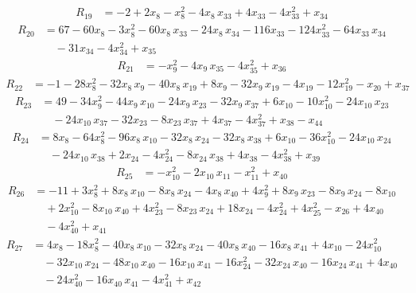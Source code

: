 \begin{align*}
R_{19} &= -2 +2x_{8} -x_{8}^{2} -4x_{8}\,x_{33} +4x_{33} -4x_{33}^{2} +x_{34}
\end{align*}
\begin{align*}
R_{20} &= 67 -60x_{8} -3x_{8}^{2} -60x_{8}\,x_{33} -24x_{8}\,x_{34} -116x_{33} -124x_{33}^{2} -64x_{33}\,x_{34} \\
&\quad {} -31x_{34} -4x_{34}^{2} +x_{35}
\end{align*}
\begin{align*}
R_{21} &= -x_{9}^{2} -4x_{9}\,x_{35} -4x_{35}^{2} +x_{36}
\end{align*}
\begin{align*}
R_{22} &= -1 -28x_{8}^{2} -32x_{8}\,x_{9} -40x_{8}\,x_{19} +8x_{9} -32x_{9}\,x_{19} -4x_{19} -12x_{19}^{2} -x_{20} +x_{37}
\end{align*}
\begin{align*}
R_{23} &= 49 -34x_{9}^{2} -44x_{9}\,x_{10} -24x_{9}\,x_{23} -32x_{9}\,x_{37} +6x_{10} -10x_{10}^{2} -24x_{10}\,x_{23} \\
&\quad {} -24x_{10}\,x_{37} -32x_{23} -8x_{23}\,x_{37} +4x_{37} -4x_{37}^{2} +x_{38} -x_{44}
\end{align*}
\begin{align*}
R_{24} &= 8x_{8} -64x_{8}^{2} -96x_{8}\,x_{10} -32x_{8}\,x_{24} -32x_{8}\,x_{38} +6x_{10} -36x_{10}^{2} -24x_{10}\,x_{24} \\
&\quad {} -24x_{10}\,x_{38} +2x_{24} -4x_{24}^{2} -8x_{24}\,x_{38} +4x_{38} -4x_{38}^{2} +x_{39}
\end{align*}
\begin{align*}
R_{25} &= -x_{10}^{2} -2x_{10}\,x_{11} -x_{11}^{2} +x_{40}
\end{align*}
\begin{align*}
R_{26} &= -11 +3x_{8}^{2} +8x_{8}\,x_{10} -8x_{8}\,x_{24} -4x_{8}\,x_{40} +4x_{9}^{2} +8x_{9}\,x_{23} -8x_{9}\,x_{24} -8x_{10} \\
&\quad {} +2x_{10}^{2} -8x_{10}\,x_{40} +4x_{23}^{2} -8x_{23}\,x_{24} +18x_{24} -4x_{24}^{2} +4x_{25}^{2} -x_{26} +4x_{40} \\
&\quad {} -4x_{40}^{2} +x_{41}
\end{align*}
\begin{align*}
R_{27} &= 4x_{8} -18x_{8}^{2} -40x_{8}\,x_{10} -32x_{8}\,x_{24} -40x_{8}\,x_{40} -16x_{8}\,x_{41} +4x_{10} -24x_{10}^{2} \\
&\quad {} -32x_{10}\,x_{24} -48x_{10}\,x_{40} -16x_{10}\,x_{41} -16x_{24}^{2} -32x_{24}\,x_{40} -16x_{24}\,x_{41} +4x_{40} \\
&\quad {} -24x_{40}^{2} -16x_{40}\,x_{41} -4x_{41}^{2} +x_{42}
\end{align*}
